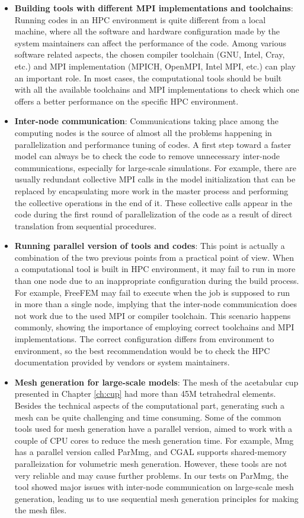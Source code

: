 \begin{itemize}
\item
\textbf{Building tools with different MPI implementations and toolchains}: Running codes in an HPC environment is quite different from a local machine, where all the software and hardware configuration made by the system maintainers can affect the performance of the code. Among various software related aspects, the chosen compiler toolchain (GNU, Intel, Cray, etc.) and MPI implementation (MPICH, OpenMPI, Intel MPI, etc.) can play an important role. In most cases, the computational tools should be built with all the available toolchains and MPI implementations to check which one offers a better performance on the specific HPC environment. 
\item
\textbf{Inter-node communication}: Communications taking place among the computing nodes is the source of almost all the problems happening in parallelization and performance tuning of codes. A first step toward a faster model can always be to check the code to remove unnecessary inter-node communications, especially for large-scale simulations. For example, there are usually redundant collective MPI calls in the model initialization that can be replaced by encapsulating more work in the master process and performing the collective operations in the end of it. These collective calls appear in the code during the first round of parallelization of the code as a result of direct translation from sequential procedures.
\item
\textbf{Running parallel version of tools and codes}: This point is actually a combination of the two previous points from a practical point of view. When a computational tool is built in HPC environment, it may fail to run in more than one node due to an inappropriate configuration during the build process. For example, FreeFEM may fail to execute when the job is supposed to run in more than a single node, implying that the inter-node communication does not work due to the used MPI or compiler toolchain. This scenario happens commonly, showing the importance of employing correct toolchains and MPI implementations. The correct configuration differs from environment to environment, so the best recommendation would be to check the HPC documentation provided by vendors or system maintainers.
\item
\textbf{Mesh generation for large-scale models}: The mesh of the acetabular cup presented in Chapter \ref{ch:cup} had more than 45M tetrahedral elements. Besides the technical aspects of the computational part, generating such a mesh can be quite challenging and time consuming. Some of the common tools used for mesh generation have a parallel version, aimed to work with a couple of CPU cores to reduce the mesh generation time. For example, Mmg has a parallel version called ParMmg, and CGAL supports shared-memory paralleization for volumetric mesh generation. However, these tools are not very reliable and may cause further problems. In our tests on ParMmg, the tool showed major issues with inter-node communication on large-scale mesh generation, leading us to use sequential mesh generation principles for making the mesh files.

\end{itemize}
